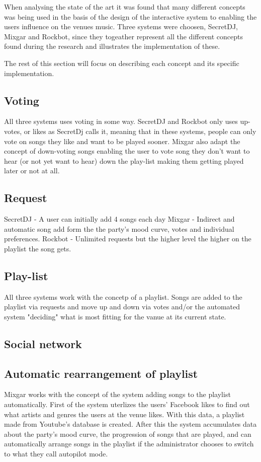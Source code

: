 When analysing the state of the art it was found that many different concepts was being used in the basis of the design of the interactive system to enabling the users influence on the venues music. Three systems were choosen, SecretDJ, Mixgar and Rockbot, since they togeather represent all the different concepts found during the research and illustrates the implementation of these.

The rest of this section will focus on describing each concept and its specific implementation.

\subsection{Voting}
All three systems uses voting in some way. SecretDJ and Rockbot only uses up-votes, or likes as SecretDj calls it, meaning that in these systems, people can only vote on songs they like and want to be played sooner. Mixgar also adapt the concept of down-voting songs enabling the user to vote song they don't want to hear (or not yet want to hear) down the play-list making them getting played later or not at all.

\subsection{Request}
SecretDJ - A user can initially add 4 songs each day
Mixgar - Indirect and automatic song add form the the party's mood curve, votes and individual preferences.
Rockbot - Unlimited requests but the higher level the higher on the playlist the song gets.

\subsection{Play-list}
All three systems work with the concetp of a playlist. Songs are added to the playlist via requests and move up and down via votes and/or the automated system "deciding" what is most fitting for the vanue at its current state.

\subsection{Social network}


\subsection{Automatic rearrangement of playlist}
Mixgar works with the concept of the system adding songs to the playlist automatically. First of the system uterlizes the users’ Facebook likes to find out what artists and genres the users at the venue likes. With this data, a playlist made from Youtube’s database is created. After this the system accumulates data about the party’s mood curve, the progression of songs that are played, and can automatically arrange songs in the playlist if the
administrator chooses to switch to what they call autopilot mode.

